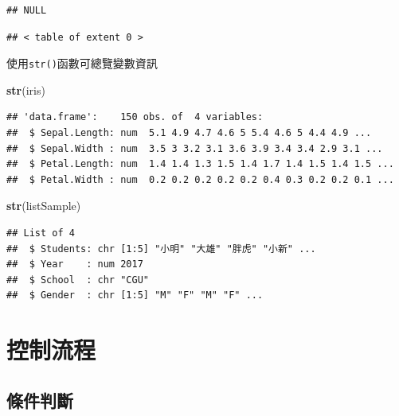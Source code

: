 \documentclass[]{book}
\newenvironment{Shaded}{\begin{snugshade}}{\end{snugshade}}
\newcommand{\KeywordTok}[1]{\textcolor[rgb]{0.13,0.29,0.53}{\textbf{{#1}}}}
\newcommand{\NormalTok}[1]{{#1}}
\theoremstyle{definition}
\theoremstyle{definition}
\theoremstyle{remark}
\begin{document}
\begin{verbatim}
## NULL
\end{verbatim}

\begin{Shaded}
\end{Shaded}

\begin{verbatim}
## < table of extent 0 >
\end{verbatim}

使用\texttt{str()}函數可總覽變數資訊

\begin{Shaded}
\begin{Highlighting}[]
\KeywordTok{str}\NormalTok{(iris)}
\end{Highlighting}
\end{Shaded}

\begin{verbatim}
## 'data.frame':    150 obs. of  4 variables:
##  $ Sepal.Length: num  5.1 4.9 4.7 4.6 5 5.4 4.6 5 4.4 4.9 ...
##  $ Sepal.Width : num  3.5 3 3.2 3.1 3.6 3.9 3.4 3.4 2.9 3.1 ...
##  $ Petal.Length: num  1.4 1.4 1.3 1.5 1.4 1.7 1.4 1.5 1.4 1.5 ...
##  $ Petal.Width : num  0.2 0.2 0.2 0.2 0.2 0.4 0.3 0.2 0.2 0.1 ...
\end{verbatim}

\begin{Shaded}
\begin{Highlighting}[]
\KeywordTok{str}\NormalTok{(listSample)}
\end{Highlighting}
\end{Shaded}

\begin{verbatim}
## List of 4
##  $ Students: chr [1:5] "小明" "大雄" "胖虎" "小新" ...
##  $ Year    : num 2017
##  $ School  : chr "CGU"
##  $ Gender  : chr [1:5] "M" "F" "M" "F" ...
\end{verbatim}

\chapter{控制流程}\label{controlstructure}

\section{條件判斷}
\end{document}
